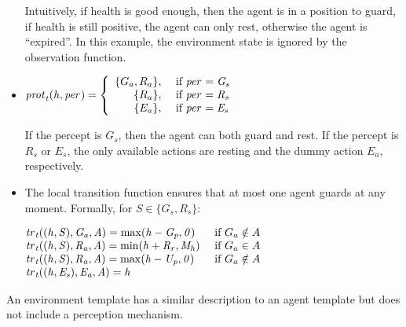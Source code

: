 \begin{example}
\begin{itemize}[$\bullet$]
    Intuitively, if health is good enough, then the agent is in a position to
    guard, if health is still positive, the agent can only rest, otherwise the
    agent is ``expired''. In this example, the environment state is ignored by
    the observation function.
    
  \item $\it{prot}_{t}(h,\it{per}_{}) = \left\{
      \begin{array}{rl}
        \{G_a, R_a\}, & \text{ if } \it{per}_{} = G_s\\ 
        \{R_a\}, & \text{ if } \it{per}_{} = R_s\\ 
        \{E_a\}, & \text{ if } \it{per}_{} = E_s\\
      \end{array} \right.$

    If the percept is $G_s$, then the agent can both guard and rest. If the
    percept is $R_s$ or $E_s$, the only available actions are resting and the
    dummy action $E_a$, respectively.
    
  \item The local transition function ensures that at most one agent guards at
    any moment. Formally, for $S \in \{G_s,R_s\}$:

    $\begin{array}{@{}l@{\quad}l}\small
       \tr{t}((h,S), G_a, A) = \max(h - G_p,0) &\text{ if }G_a\notin A\\%
       \tr{t}((h,S), R_a, A) = \min(h + R_r, M_h) &\text{ if }G_a\in A\\
       \tr{t}((h,S), R_a, A) = \max(h - U_p,0) &\text{ if }G_a\notin A\\%
       
       \tr{t}((h,E_s), E_a, A) = h\\
     \end{array}$
  \end{itemize}

\end{example}

An environment template has a similar description to an agent template but does
not include a perception mechanism.

